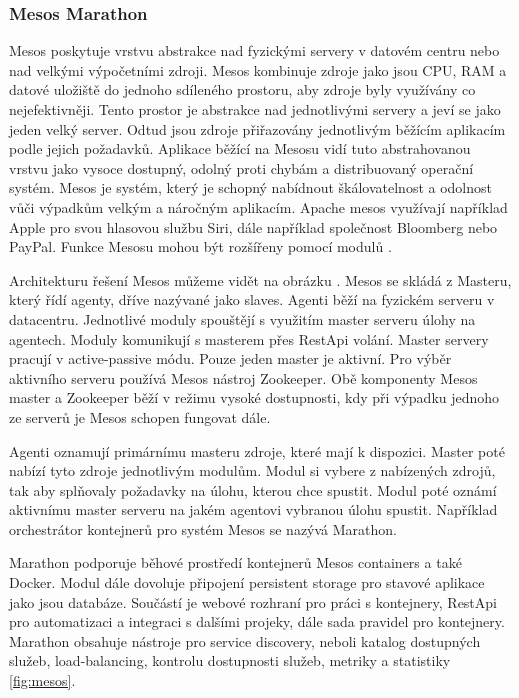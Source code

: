 \subsubsection{Mesos Marathon}
Mesos poskytuje vrstvu abstrakce nad fyzickými servery v datovém centru nebo nad velkými výpočetními zdroji. Mesos kombinuje zdroje jako jsou CPU, RAM a datové uložiště do jednoho sdíleného prostoru, aby zdroje byly využívány co nejefektivněji. Tento prostor je abstrakce nad jednotlivými servery a jeví se jako jeden velký server. Odtud jsou zdroje přiřazovány jednotlivým běžícím aplikacím podle jejich požadavků. Aplikace běžící na Mesosu vidí tuto abstrahovanou vrstvu jako vysoce dostupný, \linebreak odolný proti chybám a distribuovaný operační systém. Mesos je systém, který je \linebreak schopný nabídnout škálovatelnost a odolnost vůči výpadkům velkým a náročným aplikacím. Apache mesos využívají například Apple pro svou hlasovou službu Siri, dále například společnost Bloomberg nebo PayPal. Funkce Mesosu mohou být rozšířeny pomocí modulů \cite{delvalle}. \par
    Architekturu řešení Mesos můžeme vidět na obrázku \cite{mesos-picture}. Mesos se skládá z Masteru, který řídí agenty, dříve nazývané jako slaves. Agenti běží na fyzickém serveru \linebreak v datacentru. Jednotlivé moduly spouštějí s využitím master serveru úlohy na agentech. Moduly komunikují s masterem přes RestApi volání. Master servery pracují v active-passive módu. Pouze jeden master je aktivní. Pro výběr aktivního serveru používá Mesos nástroj Zookeeper. Obě komponenty Mesos master a Zookeeper běží v režimu vysoké dostupnosti, kdy při výpadku jednoho ze serverů je Mesos schopen fungovat dále. \par
	Agenti oznamují primárnímu masteru zdroje, které mají k dispozici. Master poté nabízí tyto zdroje jednotlivým modulům. Modul si vybere z nabízených zdrojů, tak aby splňovaly požadavky na úlohu, kterou chce spustit. Modul poté oznámí aktivnímu master serveru na jakém agentovi vybranou úlohu spustit. Například orchestrátor kontejnerů pro systém Mesos se nazývá Marathon.\par
	Marathon podporuje běhové prostředí kontejnerů Mesos containers a také Docker. Modul dále dovoluje připojení persistent storage pro stavové aplikace jako jsou \linebreak databáze. Součástí je webové rozhraní pro práci s kontejnery, RestApi pro automatizaci a integraci s dalšími projeky, dále sada pravidel pro kontejnery. Marathon obsahuje nástroje pro service discovery, neboli katalog dostupných služeb, load-balancing, kontrolu dostupnosti služeb, metriky a statistiky \ref{fig:mesos}.


